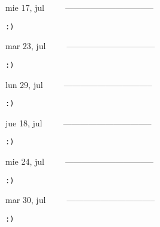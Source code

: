 \documentclass[letterpaper,10pt]{article}
\begin{document}
\begin{multicols}{3}
{mie 17, jul\ \ \ \ \ --------------------------------}
\begin{flushright}\begin{small}\texttt{:)}\end{small}\end{flushright}
\vfill
{mar 23, jul\ \ \ \ \ --------------------------------}
\begin{flushright}\begin{small}\texttt{:)}\end{small}\end{flushright}\par
\vfill
{lun 29, jul\ \ \ \ \ --------------------------------}
\begin{flushright}\begin{small}\texttt{:)}\end{small}\end{flushright}\par
\vfill
\end{multicols}
\vspace{1.05cm}

\begin{multicols}{3}
{jue 18, jul\ \ \ \ \ --------------------------------}
\begin{flushright}\begin{small}\texttt{:)}\end{small}\end{flushright}
\vfill
{mie 24, jul\ \ \ \ \ --------------------------------}
\begin{flushright}\begin{small}\texttt{:)}\end{small}\end{flushright}\par
\vfill
{mar 30, jul\ \ \ \ \ --------------------------------}
\begin{flushright}\begin{small}\texttt{:)}\end{small}\end{flushright}\par
\vfill
\end{multicols}
\vspace{1.05cm}
\end{document}
